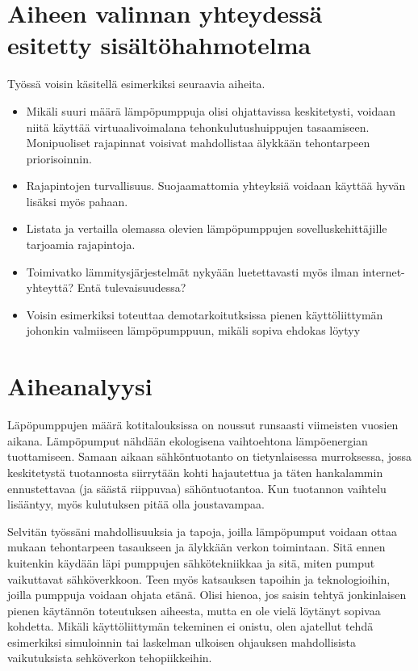 \section{Aiheen valinnan yhteydessä esitetty sisältöhahmotelma}
  Työssä voisin käsitellä esimerkiksi seuraavia aiheita.
  \begin{itemize}
    \item  Mikäli suuri määrä lämpöpumppuja olisi ohjattavissa keskitetysti, voidaan niitä käyttää virtuaalivoimalana tehonkulutushuippujen tasaamiseen. Monipuoliset rajapinnat voisivat mahdollistaa älykkään tehontarpeen priorisoinnin.
    \item Rajapintojen turvallisuus. Suojaamattomia yhteyksiä voidaan käyttää hyvän lisäksi myös pahaan.
    \item Listata ja vertailla olemassa olevien lämpöpumppujen sovelluskehittäjille tarjoamia rajapintoja.
    \item  Toimivatko lämmitysjärjestelmät nykyään luetettavasti myös ilman internet-yhteyttä? Entä tulevaisuudessa?
    \item Voisin esimerkiksi toteuttaa demotarkoitutksissa pienen käyttöliittymän johonkin valmiiseen lämpöpumppuun, mikäli sopiva ehdokas löytyy
  \end{itemize}
\section{Aiheanalyysi}

  Läpöpumppujen määrä kotitalouksissa on noussut runsaasti viimeisten vuosien aikana. Lämpöpumput nähdään ekologisena vaihtoehtona lämpöenergian tuottamiseen. Samaan aikaan sähköntuotanto on tietynlaisessa murroksessa, jossa keskitetystä tuotannosta siirrytään kohti hajautettua ja täten hankalammin ennustettavaa (ja säästä riippuvaa) sähöntuotantoa. Kun tuotannon vaihtelu lisääntyy, myös kulutuksen pitää olla joustavampaa.

  Selvitän työssäni mahdollisuuksia ja tapoja, joilla lämpöpumput voidaan ottaa mukaan tehontarpeen tasaukseen ja älykkään verkon toimintaan. Sitä ennen kuitenkin käydään läpi pumppujen sähkötekniikkaa ja sitä, miten pumput vaikuttavat sähköverkkoon. Teen myös katsauksen tapoihin ja teknologioihin, joilla pumppuja voidaan ohjata etänä. Olisi hienoa, jos saisin tehtyä jonkinlaisen pienen käytännön toteutuksen aiheesta, mutta en ole vielä löytänyt sopivaa kohdetta. Mikäli käyttöliittymän tekeminen ei onistu, olen ajatellut tehdä esimerkiksi simuloinnin tai laskelman ulkoisen ohjauksen mahdollisista vaikutuksista sehköverkon tehopiikkeihin.

